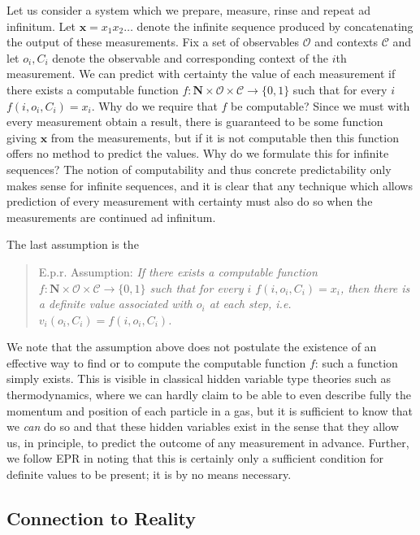 \documentclass[11pt, a4paper]{article}
\theoremstyle{definition}
\newcommand{\seq}[1]{\mathbf{#1}}
\begin{document}
Let us consider a system which we prepare, measure, rinse and repeat ad infinitum.
Let $\seq{x}=x_1 x_2 \dots$ denote the infinite sequence produced by concatenating the output of these measurements.
Fix a set of observables $\mathcal{O}$ and contexts $\mathcal{C}$ and let $o_i,C_i$ denote the observable and corresponding context of the $i$th measurement.
We can predict with certainty the value of each measurement if there exists a computable function $f : \mathbf{N}\times \mathcal{O}\times \mathcal{C} \to \{0,1\}$ such that for every $i$ $f(i,o_i,C_i)=x_i$.
Why do we require that $f$ be computable?
Since we must with every measurement obtain a result, there is guaranteed to be some function giving $\seq{x}$ from the measurements, but if it is not computable then this function offers no method to predict the values.
Why do we formulate this for infinite sequences?
The notion of computability and thus concrete predictability only makes sense for infinite sequences, and it is clear that any technique which allows prediction of every measurement with certainty must also do so when the measurements are continued ad infinitum.

The last assumption is the

\begin{quote}
E.p.r. Assumption:  {\em If
there exists a computable function $f : \mathbf{N}\times \mathcal{O}\times \mathcal{C} \to \{0,1\}$ such that for every $i$ $f(i,o_i,C_i)=x_i$, then there is a definite value associated with $o_i$ at each step, i.e.\ $v_i(o_i,C_i)=f(i,o_i,C_i)$.}
\end{quote}

We note that the assumption above does not postulate the existence of an effective way to find or to compute
 the computable function $f$: such a function simply exists.
This is visible in classical hidden variable type theories such as thermodynamics, where we can hardly claim to be able to even describe fully the momentum and position of each particle in a gas, but it is sufficient to know that we \emph{can} do so and that these hidden variables exist in the sense that they allow us, in principle,  to predict the outcome of any measurement in advance.
Further, we follow EPR in noting that this is certainly only a sufficient condition for definite values to be present; it is by no means necessary.


\subsection{Connection to Reality}
\end{document}
